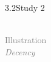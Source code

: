 \documentclass[xcolor=table,9pt,aspectratio=169]{beamer}
\begin{document}
\begin{frame}{\vspace*{10mm}3.2\hspace*{1em}Study 2}
\begin{multicols}{4}
\begin{center}
      \\
      \textcolor{gray}{Illustration\\\textit{Decency}}\\
      \\

\end{center}
\end{multicols}
\end{frame}
\end{document}
